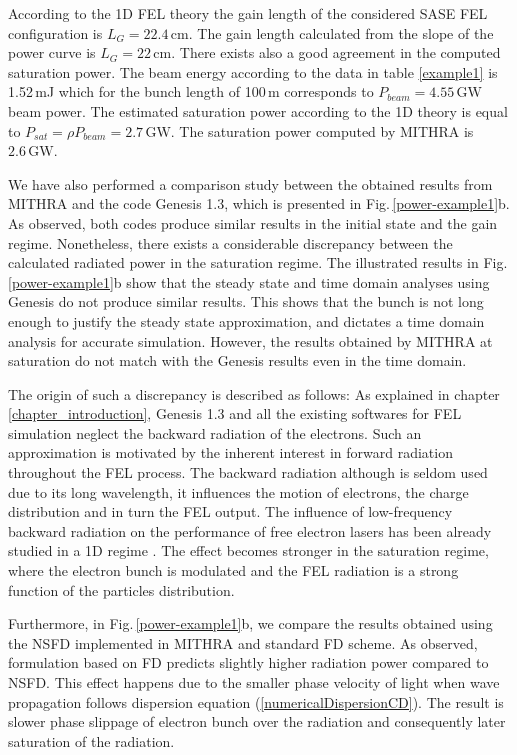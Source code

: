 According to the 1D FEL theory the gain length of the considered SASE FEL configuration is $L_G=22.4\,\mathrm{cm}$.
%
The gain length calculated from the slope of the power curve is $L_G=22\,\mathrm{cm}$.
%
There exists also a good agreement in the computed saturation power.
%
The beam energy according to the data in table \ref{example1} is 1.52\,mJ which for the bunch length of 100\,{\textmu}m corresponds to $P_{beam}=4.55\,\mathrm{GW}$ beam power.
%
The estimated saturation power according to the 1D theory is equal to $P_{sat} = \rho P_{beam} = 2.7\,\mathrm{GW}$.
%
The saturation power computed by MITHRA is $2.6\,\mathrm{GW}$.

We have also performed a comparison study between the obtained results from MITHRA and the code Genesis 1.3, which is presented in Fig.\,\ref{power-example1}b.
%
As observed, both codes produce similar results in the initial state and the gain regime.
%
Nonetheless, there exists a considerable discrepancy between the calculated radiated power in the saturation regime.
%
The illustrated results in Fig.\,\ref{power-example1}b show that the steady state and time domain analyses using Genesis do not produce similar results.
%
This shows that the bunch is not long enough to justify the steady state approximation, and dictates a time domain analysis for accurate simulation.
%
However, the results obtained by MITHRA at saturation do not match with the Genesis results even in the time domain.

The origin of such a discrepancy is described as follows:
%
As explained in chapter \ref{chapter_introduction}, Genesis 1.3 and all the existing softwares for FEL simulation neglect the backward radiation of the electrons.
%
Such an approximation is motivated by the inherent interest in forward radiation throughout the FEL process.
%
The backward radiation although is seldom used due to its long wavelength, it influences the motion of electrons, the charge distribution and in turn the FEL output.
%
The influence of low-frequency backward radiation on the performance of free electron lasers has been already studied in a 1D regime \cite{maroli2000effects}.
%
The effect becomes stronger in the saturation regime, where the electron bunch is modulated and the FEL radiation is a strong function of the particles distribution.

Furthermore, in Fig.\,\ref{power-example1}b, we compare the results obtained using the NSFD implemented in MITHRA and standard FD scheme.
%
As observed, formulation based on FD predicts slightly higher radiation power compared to NSFD.
%
This effect happens due to the smaller phase velocity of light when wave propagation follows dispersion equation (\ref{numericalDispersionCD}).
%
The result is slower phase slippage of electron bunch over the radiation and consequently later saturation of the radiation.

